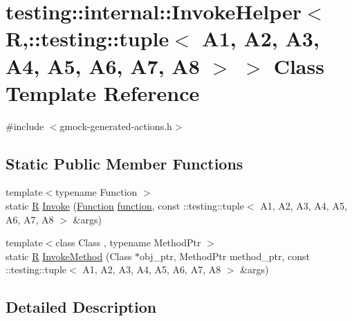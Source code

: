 \hypertarget{classtesting_1_1internal_1_1_invoke_helper_3_01_r_00_1_1testing_1_1tuple_3_01_a1_00_01_a2_00_01_e6fe94962f933bc582acd55e0092e60f}{}\section{testing\+:\+:internal\+:\+:Invoke\+Helper$<$ R,\+:\+:testing\+:\+:tuple$<$ A1, A2, A3, A4, A5, A6, A7, A8 $>$ $>$ Class Template Reference}
\label{classtesting_1_1internal_1_1_invoke_helper_3_01_r_00_1_1testing_1_1tuple_3_01_a1_00_01_a2_00_01_e6fe94962f933bc582acd55e0092e60f}


{\ttfamily \#include $<$gmock-\/generated-\/actions.\+h$>$}

\subsection*{Static Public Member Functions}
\begin{DoxyCompactItemize}
\item 
{\footnotesize template$<$typename Function $>$ }\\static \hyperlink{typedefs__9_8js_afb423b73ee7b6c04d2d54fc06e405404}{R} \hyperlink{classtesting_1_1internal_1_1_invoke_helper_3_01_r_00_1_1testing_1_1tuple_3_01_a1_00_01_a2_00_01_e6fe94962f933bc582acd55e0092e60f_ab3e6e35a1321c77445f7b8a7ffc2296d}{Invoke} (\hyperlink{structtesting_1_1internal_1_1_function}{Function} \hyperlink{_07copy_08_2_undistort_image_8m_aa0b19300b507d475ab9f1525750bc11f}{function}, const \+::testing\+::tuple$<$ A1, A2, A3, A4, A5, A6, A7, A8 $>$ \&args)
\item 
{\footnotesize template$<$class Class , typename Method\+Ptr $>$ }\\static \hyperlink{typedefs__9_8js_afb423b73ee7b6c04d2d54fc06e405404}{R} \hyperlink{classtesting_1_1internal_1_1_invoke_helper_3_01_r_00_1_1testing_1_1tuple_3_01_a1_00_01_a2_00_01_e6fe94962f933bc582acd55e0092e60f_ac7b11abc03a2df1b3572a8852efc0fb9}{Invoke\+Method} (Class $\ast$obj\+\_\+ptr, Method\+Ptr method\+\_\+ptr, const \+::testing\+::tuple$<$ A1, A2, A3, A4, A5, A6, A7, A8 $>$ \&args)
\end{DoxyCompactItemize}


\subsection{Detailed Description}
